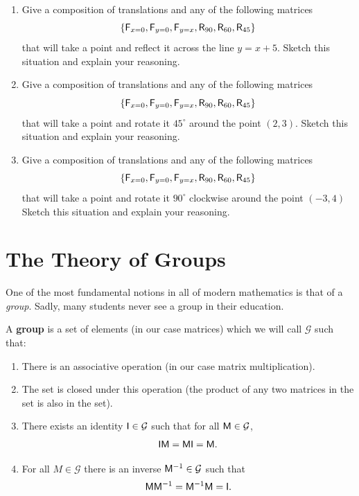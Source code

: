 \begin{problems}
\begin{enumerate}
\item Give a composition of translations and any of the following matrices
\[
\{\mathsf{F}_{x=0},\mathsf{F}_{y=0}, \mathsf{F}_{y=x}, \mathsf{R}_{90},\mathsf{R}_{60},\mathsf{R}_{45}\}
\]
that will take a
  point and reflect it across the line $y=x+5$. Sketch this situation
  and explain your reasoning.

\item Give a composition of translations and any of the following matrices
\[
\{
\mathsf{F}_{x=0},\mathsf{F}_{y=0}, \mathsf{F}_{y=x}, \mathsf{R}_{90},\mathsf{R}_{60},\mathsf{R}_{45}\}
\]
that will take a point and rotate it $45^\circ$ around the point
$(2,3)$. Sketch this situation and explain your reasoning.

\item Give a composition of translations and any of the following matrices
\[
\{\mathsf{F}_{x=0},\mathsf{F}_{y=0}, \mathsf{F}_{y=x}, \mathsf{R}_{90},\mathsf{R}_{60},\mathsf{R}_{45}\}
\]
that will take a point and rotate it $90^\circ$ clockwise around the
point $(-3,4)$ Sketch this situation and explain your reasoning.

\end{enumerate}
\end{problems}


\newpage



\section{The Theory of Groups}

One of the most fundamental notions in all of modern mathematics is
that of a \textit{group}. Sadly, many students never see a group in their
education.

\begin{definition}
A \textbf{group} is a set of elements (in our case matrices) which we
will call $\mathcal{G}$ such that: 
\begin{enumerate}
\item There is an associative operation (in our case matrix multiplication).
\item The set is closed under this operation (the product of any two
  matrices in the set is also in the set).
\item There exists an identity $\mathsf{I}\in \mathcal{G}$ such that for all $\mathsf{M}\in \mathcal{G}$, 
\[
\mathsf{I}\mathsf{M}=\mathsf{M}\mathsf{I} = \mathsf{M}.
\]
\item For all $M\in \mathcal{G}$ there is an inverse $\mathsf{M}^{-1}\in \mathcal{G}$ such that 
\[
\mathsf{M} \mathsf{M}^{-1}= \mathsf{M}^{-1}\mathsf{M}= \mathsf{I}.
\]
\end{enumerate}
\end{definition}


